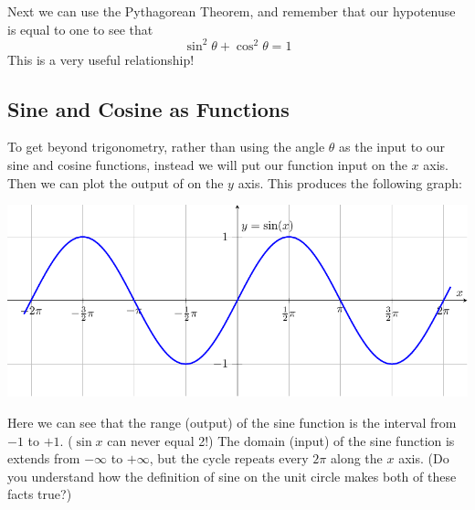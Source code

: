Next we can use the Pythagorean Theorem, and remember that our hypotenuse is equal to one to see that
\[ \sin^2 \theta + \cos^2 \theta = 1 \]
This is a very useful relationship!


\subsection*{Sine and Cosine as Functions} 

To get beyond trigonometry, rather than using the angle $\theta$ as the input to our sine
and cosine functions, instead we will put our function input on the $x$ axis.  Then we can
plot the output of on the $y$ axis.  This produces the following graph:
\begin{center}
    \includegraphics[width=0.85\columnwidth]{figures/0-5-fig5.pdf}
\end{center}


\noindent
Here we can see that the range (output) of the sine function is the interval from $-1$ to $+1$.  ($\sin x$ can never equal 2!)  The domain (input) of the sine function is extends from $-\infty$ to $+\infty$, but the cycle repeats every $2 \pi$ along the $x$ axis.  (Do you understand how the definition of sine on the unit circle makes both of these facts true?)

